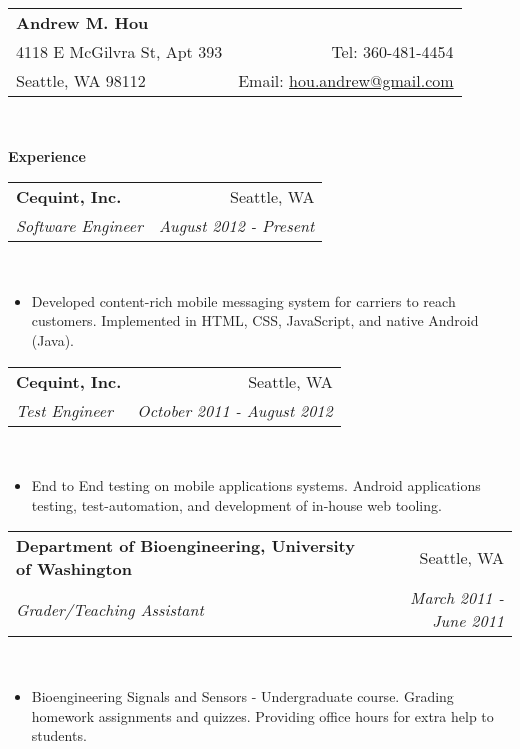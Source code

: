 \documentclass[letterpaper,11pt]{article}
\makeatletter
\newcommand{\resitem}[1]{\item #1 \vspace{-2pt}}
\newcommand{\resheading}[1]{{\large \colorbox{mygrey}{\begin{minipage}{\textwidth}{\textbf{#1 \vphantom{p\^{E}}}}\end{minipage}}}}
\newcommand{\ressubheading}[4]{ %
        \begin{tabular*}{\textwidth}{l@{\extracolsep{\fill}}r}
            \textbf{#1} & #2 \\
                  \textit{#3} & \textit{#4} \\
    \end{tabular*}\vspace{-6pt}}
\newenvironment{section-content}
    {\begin{Sbox}\begin{minipage}{\textwidth}\vspace{0.04in}}
        {\end{minipage}\end{Sbox}\colorbox{white}{\TheSbox}\vspace{0.1in}}
\makeatother
\begin{document}
            \newcommand{\myheader}{
                \begin{tabular*}{1.006\textwidth}{l@{\extracolsep{\fill}}r}
                    \textbf{{\LARGE Andrew M. Hou}}  &\\
                                 4118 E McGilvra St, Apt 393 &  Tel: 360-481-4454\\
                                        Seattle, WA 98112 &  Email: \href{mailto:hou.andrew@gmail.com}{hou.andrew@gmail.com} \\
                \end{tabular*}
                \\
            \vspace{0.1in}}

            \myheader
            \resheading{Experience}
            \begin{section-content}
                \ressubheading{Cequint, Inc.}{Seattle, WA}{Software Engineer}{August 2012 - Present}\\
                    { \footnotesize
                        \begin{itemize}
                                \resitem{Developed content-rich mobile messaging system for carriers to reach customers. Implemented in HTML, CSS, JavaScript, and native Android (Java).}
                        \end{itemize}
                    }

                \ressubheading{Cequint, Inc.}{Seattle, WA}{Test Engineer}{October 2011 - August 2012}\\
                    { \footnotesize
                        \begin{itemize}
                                \resitem{End to End testing on mobile applications systems. Android applications testing, test-automation, and development of in-house web tooling.}
                        \end{itemize}
                    }

                \ressubheading{Department of Bioengineering, University of Washington}{Seattle, WA}{Grader/Teaching Assistant}{March 2011 - June 2011}\\
                    { \footnotesize
                        \begin{itemize}
                                \resitem{Bioengineering Signals and Sensors - Undergraduate course. Grading homework assignments and quizzes. Providing office hours for extra help to students.}
                        \end{itemize}
                    }


\end{section-content}
\end{document}
